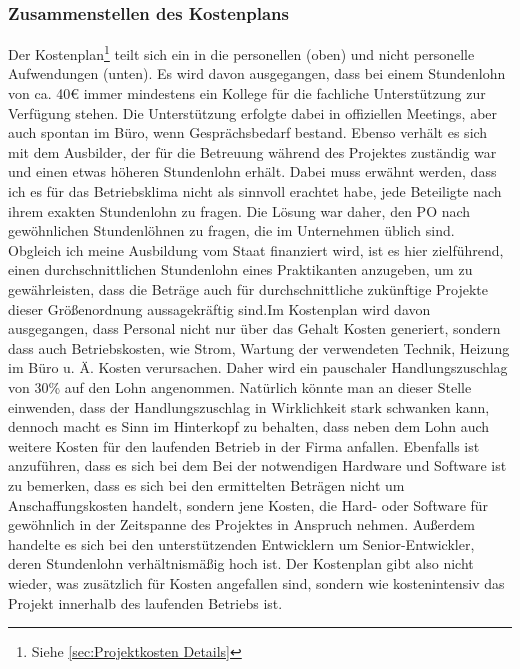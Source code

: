 \documentclass[11pt,toc=sectionentrywithoutdots, 
headheight=44pt, headings=optiontoheadandtoc, hyperfootnotes=false, hypertexnames=false]{scrartcl}
\newcommand\extendedref[1]{Siehe \ref{#1}}
\begin{document}
\subsubsection{Zusammenstellen des Kostenplans}
Der Kostenplan{\footnote{\extendedref{sec:Projektkosten Details}}} teilt sich ein in die personellen (oben) und nicht personelle Aufwendungen (unten). Es wird davon ausgegangen, dass bei einem Stundenlohn von ca. 40€ immer mindestens ein Kollege für die fachliche Unterstützung zur Verfügung stehen. Die Unterstützung erfolgte dabei in offiziellen Meetings, aber auch spontan im Büro, wenn Gesprächsbedarf bestand. Ebenso verhält es sich mit dem Ausbilder, der für die Betreuung während des Projektes zuständig war und einen etwas höheren Stundenlohn erhält. Dabei muss erwähnt werden, dass ich es für das Betriebsklima nicht als sinnvoll erachtet habe, jede Beteiligte nach ihrem exakten Stundenlohn zu fragen. Die Lösung war daher, den \acs{PO} nach gewöhnlichen Stundenlöhnen zu fragen, die im Unternehmen üblich sind. Obgleich ich meine Ausbildung vom Staat finanziert wird, ist es hier zielführend, einen durchschnittlichen Stundenlohn eines Praktikanten anzugeben, um zu gewährleisten, dass die Beträge auch für durchschnittliche zukünftige Projekte dieser Größenordnung aussagekräftig sind.\newline\newline Im Kostenplan wird davon ausgegangen, dass Personal nicht nur über das Gehalt Kosten generiert, sondern dass auch Betriebskosten, wie Strom, Wartung der verwendeten Technik, Heizung im Büro u. Ä. Kosten verursachen. Daher wird ein pauschaler Handlungszuschlag von 30\% auf den Lohn angenommen. Natürlich könnte man an dieser Stelle einwenden, dass der Handlungszuschlag in Wirklichkeit stark schwanken kann, dennoch macht es Sinn im Hinterkopf zu behalten, dass neben dem Lohn auch weitere Kosten für den laufenden Betrieb in der Firma anfallen. Ebenfalls ist anzuführen, dass es sich bei dem  Bei der notwendigen Hardware und Software ist zu bemerken, dass es sich bei den ermittelten Beträgen nicht um Anschaffungskosten handelt, sondern jene Kosten, die Hard- oder Software für gewöhnlich in der Zeitspanne des Projektes in Anspruch nehmen. Außerdem handelte es sich bei den unterstützenden Entwicklern um Senior-Entwickler, deren Stundenlohn verhältnismäßig hoch ist. Der Kostenplan gibt also nicht wieder, was zusätzlich für Kosten angefallen sind, sondern wie kostenintensiv das Projekt innerhalb des laufenden Betriebs ist.

\end{document}
